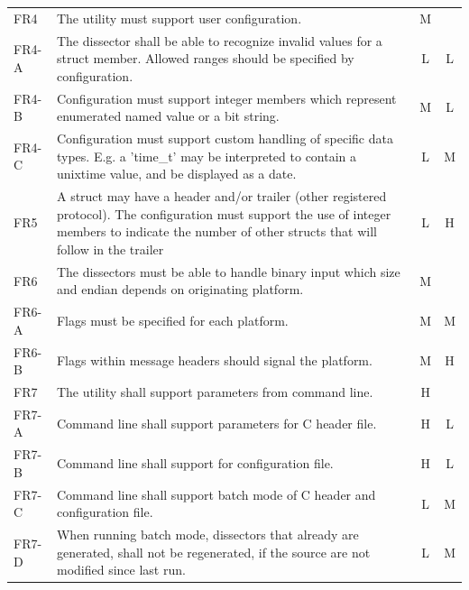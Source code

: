 \begin{table}[htbp]
{\begin{tabularx}{1.2\textwidth}{l X c c}
	\midrule
	FR4 & The utility must support user configuration.
		& M & \\
	FR4-A & The dissector shall be able to recognize invalid values for
		a struct member. Allowed ranges should be specified by configuration.
		& L & L \\
	FR4-B & Configuration must support integer members which represent
		enumerated named value or a bit string.
		& M & L \\
	FR4-C & Configuration must support custom handling of specific data
		types. E.g. a 'time\_t' may be interpreted to contain a unixtime value,
		and be displayed as a date.
		& L & M \\
	\midrule
	FR5 & A struct may have a header and/or trailer (other registered
		protocol). The configuration must support the use of integer members to
		indicate the number of other structs that will follow in the trailer
		& L & H \\
	\midrule
	FR6 & The dissectors must be able to handle binary input which size
		and endian depends on originating platform.
		& M & \\
	FR6-A & Flags must be specified for each platform.
		& M & M \\
	FR6-B & Flags within message headers should signal the platform.
		& M & H \\
	\midrule
	FR7 & The utility shall support parameters from command line.
		& H & \\
	FR7-A & Command line shall support parameters for C header file.
		& H & L \\
	FR7-B & Command line shall support for configuration file.
		& H & L \\
	FR7-C & Command line shall support batch mode of C header and
		configuration file.
		& L & M \\
	FR7-D & When running batch mode, dissectors that already are
		generated, shall not be regenerated, if the source are not modified
		since last run.
		& L & M \\
	\bottomrule
\end{tabularx}}
\end{table}

